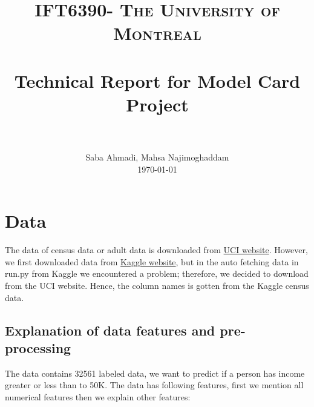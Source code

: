 \documentclass[paper=a4, fontsize=11pt]{scrartcl}
\title{
		\usefont{OT1}{bch}{b}{n}
		\normalfont \normalsize \textsc{IFT6390- The University of Montreal} \\ [25pt]
		\horrule{0.5pt} \\[0.4cm]
		\huge Technical Report for Model Card Project  \\
		\horrule{2pt} \\[0.5cm]
}
\author{
		\normalfont 								\normalsize
        Saba Ahmadi, Mahsa Najimoghaddam\\[-3pt]		\normalsize
        \today
}
\date{}
\numberwithin{equation}{section}		%
\numberwithin{figure}{section}			%
\numberwithin{table}{section}				%
\begin{document}
\maketitle
\section{Data}
The data of census data or adult data is downloaded from \href {https://archive.ics.uci.edu/ml/machine-learning-databases/adult/adult.data}{UCI website}. However, we first downloaded data from \href {https://www.kaggle.com}{Kaggle website}, but in the auto fetching data in run.py from Kaggle we encountered a problem; therefore, we decided to download from the UCI website. Hence, the column names is gotten from the Kaggle census data.

\subsection{Explanation of data features and pre-processing}
The data contains 32561 labeled data, we want to predict if a person has income greater or less than to 50K. The data has following features, first we mention all numerical features then we explain other features:
\end{document}
